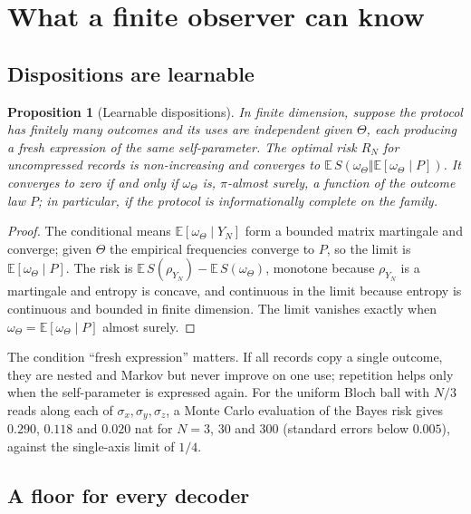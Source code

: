 \documentclass[12pt]{article}
\newtheorem{proposition}[theorem]{Proposition}
\theoremstyle{definition}
\theoremstyle{remark}
\newcommand{\E}{\mathbb E}
\begin{document}
\section{What a finite observer can know}\label{sec:4}

\subsection{Dispositions are learnable}

\begin{proposition}[Learnable dispositions]\label{prop:learn}
In finite dimension, suppose the protocol has finitely many outcomes and its uses are independent given $\Theta$, each producing a fresh expression of the same self-parameter. The optimal risk $R_N$ for uncompressed records is non-increasing and converges to $\E\,S(\omega_\Theta\Vert\E[\omega_\Theta\mid P])$. It converges to zero if and only if $\omega_\Theta$ is, $\pi$-almost surely, a function of the outcome law $P$; in particular, if the protocol is informationally complete on the family.
\end{proposition}

\begin{proof}
The conditional means $\E[\omega_\Theta\mid Y_N]$ form a bounded matrix martingale and converge; given $\Theta$ the empirical frequencies converge to $P$, so the limit is $\E[\omega_\Theta\mid P]$. The risk is $\E\,S(\rho_{Y_N})-\E\,S(\omega_\Theta)$, monotone because $\rho_{Y_N}$ is a martingale and entropy is concave, and continuous in the limit because entropy is continuous and bounded in finite dimension. The limit vanishes exactly when $\omega_\Theta=\E[\omega_\Theta\mid P]$ almost surely.
\end{proof}

The condition ``fresh expression'' matters. If all records copy a single outcome, they are nested and Markov but never improve on one use; repetition helps only when the self-parameter is expressed again. For the uniform Bloch ball with $N/3$ reads along each of $\sigma_x,\sigma_y,\sigma_z$, a Monte Carlo evaluation of the Bayes risk gives $0.290$, $0.118$ and $0.020$ nat for $N=3$, $30$ and $300$ (standard errors below $0.005$), against the single-axis limit of $1/4$.

\subsection{A floor for every decoder}
\end{document}
